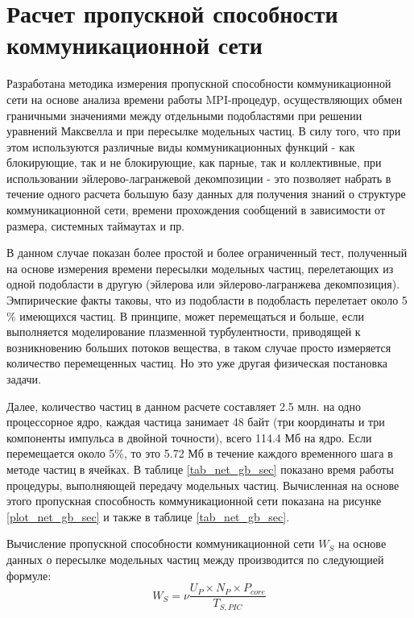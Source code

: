 \section{Расчет пропускной способности коммуникационной сети}
\label{perfCommNet}
Разработана методика измерения пропускной способности коммуникационной сети на основе анализа времени работы MPI-процедур, осуществляющих обмен граничными значениями между отдельными подобластями при решении уравнений Максвелла и при пересылке модельных частиц. В силу того, что при этом используются различные виды коммуникационных функций  - как блокирующие, так и не блокирующие, как парные, так и коллективные, при использовании эйлерово-лагранжевой декомпозиции - это позволяет набрать в течение одного расчета большую базу данных для получения знаний о структуре коммуникационной сети, времени прохождения сообщений в зависимости от размера, системных таймаутах и пр. 

В данном случае показан более простой и более ограниченный тест, полученный на основе измерения времени пересылки модельных частиц, перелетающих из одной подобласти в другую (эйлерова или эйлерово-лагранжева декомпозиция). Эмпирические факты таковы, что из подобласти в подобласть перелетает около 5 \% имеющихся частиц. В принципе, может перемещаться и больше, если выполняется моделирование плазменной турбулентности, приводящей к возникновению больших потоков вещества, в таком случае просто измеряется количество перемещенных частиц. Но это уже другая физическая постановка задачи.

Далее, количество частиц в данном расчете составляет 2.5 млн. на одно процессорное ядро, каждая частица занимает 48 байт (три координаты и три компоненты импульса в двойной точности), всего 114.4 Мб на ядро. Если перемещается около 5\%, то это 5.72 Мб в течение каждого временного шага в методе частиц в ячейках. В таблице \ref{tab_net_gb_sec} показано время работы процедуры, выполняющей передачу модельных частиц. Вычисленная на основе этого пропускная способность коммуникационной сети показана на рисунке \ref{plot_net_gb_sec} и также в таблице \ref{tab_net_gb_sec}.



Вычисление пропускной способности коммуникационной сети $W_S$ на основе данных о пересылке модельных частиц между  производится по следующией формуле:
\begin{equation}
W_S =  \nu \frac{U_P\times N_P \times P_{core}}{T_{S,PIC}}
\label{Net_performance_peer}
\end{equation}


